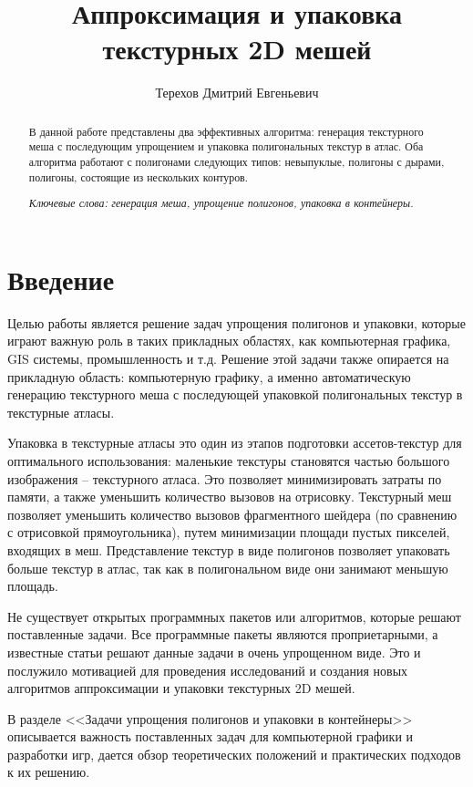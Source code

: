 \documentclass{fefu_thesis/cls/fefu}
\author{Терехов Дмитрий Евгеньевич}
\title{Аппроксимация и упаковка текстурных 2D мешей}
\begin{document}
    \makethesistitlebackside[1.22]
    \begin{abstract}
        В данной работе представлены два эффективных алгоритма: генерация текстурного меша с последующим упрощением и упаковка полигональных текстур в атлас. Оба алгоритма работают с полигонами следующих типов: невыпуклые, полигоны с дырами, полигоны, состоящие из нескольких контуров.

        \textit{Ключевые слова: генерация меша, упрощение полигонов, упаковка в контейнеры.}
    \end{abstract}
    \pagebreak
    \tableofcontents
    \pagebreak
    {\centering\section*{Введение}}
    Целью работы является решение задач упрощения полигонов и упаковки, которые играют важную роль в таких прикладных областях, как компьютерная графика, GIS системы, промышленность и т.д. Решение этой задачи также опирается на прикладную область: компьютерную графику, а именно автоматическую генерацию текстурного меша с последующей упаковкой полигональных текстур в текстурные атласы.

    Упаковка в текстурные атласы это один из этапов подготовки ассетов-текстур для оптимального использования: маленькие текстуры становятся частью большого изображения -- текстурного атласа. Это позволяет минимизировать затраты по памяти, а также уменьшить количество вызовов на отрисовку. Текстурный меш позволяет уменьшить количество вызовов фрагментного шейдера (по сравнению с отрисовкой прямоугольника), путем минимизации площади пустых пикселей, входящих в меш. Представление текстур в виде полигонов позволяет упаковать больше текстур в атлас, так как в полигональном виде они занимают меньшую площадь.

    Не существует открытых программных пакетов или алгоритмов, которые решают поставленные задачи. Все программные пакеты являются проприетарными, а известные статьи решают данные задачи в очень упрощенном виде. Это и послужило мотивацией для проведения исследований и создания новых алгоритмов аппроксимации и упаковки текстурных 2D мешей.

    В разделе <<Задачи упрощения полигонов и упаковки в контейнеры>> описывается важность поставленных задач для компьютерной графики и разработки игр, дается обзор теоретических положений и практических подходов к их решению.
\end{document}
